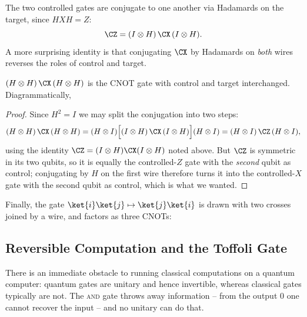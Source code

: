 The two controlled gates are conjugate to one another via Hadamards on the target, since $HXH = Z$:
$$\CZ = (I\otimes H)\,\CX\,(I\otimes H).$$
A more surprising identity is that conjugating $\CX$ by Hadamards on \emph{both} wires reverses the roles of control and target.

\begin{proposition}
	$(H\otimes H)\,\CX\,(H\otimes H)$ is the CNOT gate with control and target interchanged. Diagrammatically,
	\begin{center}
	\end{center}
\end{proposition}

\begin{proof}
	Since $H^2 = I$ we may split the conjugation into two steps:
	$$(H\otimes H)\,\CX\,(H\otimes H) = (H\otimes I)\Big[(I\otimes H)\,\CX\,(I\otimes H)\Big](H\otimes I) = (H\otimes I)\,\CZ\,(H\otimes I),$$
	using the identity $\CZ = (I\otimes H)\CX(I\otimes H)$ noted above. But $\CZ$ is symmetric in its two qubits, so it is equally the controlled-$Z$ gate with the \emph{second} qubit as control; conjugating by $H$ on the first wire therefore turns it into the controlled-$X$ gate with the second qubit as control, which is what we wanted.
\end{proof}

Finally, the  gate $\ket{i}\ket{j}\mapsto\ket{j}\ket{i}$ is drawn with two crosses joined by a wire, and factors as three CNOTs:

\begin{center}
\end{center}

\subsection{Reversible Computation and the Toffoli Gate}\label{sec:reversible}

There is an immediate obstacle to running classical computations on a quantum computer: quantum gates are unitary and hence invertible, whereas classical gates typically are not. The \textsc{and} gate throws away information -- from the output $0$ one cannot recover the input -- and no unitary can do that.

